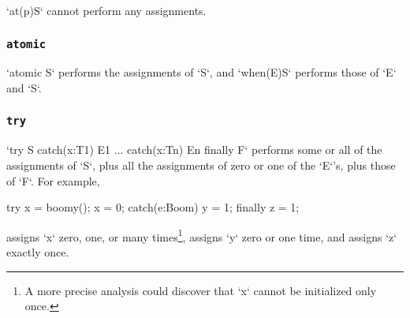 
\xcd`at(p)S` cannot perform any assignments.

\subsubsection{{\tt atomic}}

\xcd`atomic S` performs the assignments of \xcd`S`, 
and \xcd`when(E)S` performs those of \xcd`E` and \xcd`S`.  

\subsubsection{{\tt try}}

\xcd`try S catch(x:T1) E1 ... catch(x:Tn) En  finally F` 
performs some or all of the assignments of \xcd`S`, plus all the assignments
of zero or one of the \xcd`E`'s, plus those of \xcd`F`.  
For example,
\begin{xten}
try {
  x = boomy();
  x = 0;
}
catch(e:Boom) { y = 1; }
finally { z = 1; }
\end{xten}
\noindent 
assigns \xcd`x` zero, one, or many times\footnote{A more precise
analysis could discover that \xcd`x` cannot be initialized only once.}, 
assigns \xcd`y` zero or one time, and assigns \xcd`z` exactly once.

